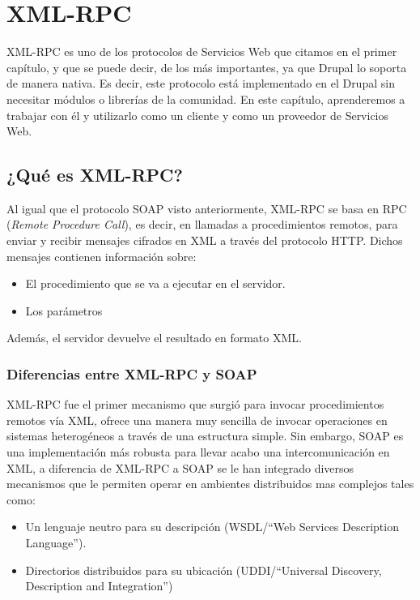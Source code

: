 \section{XML-RPC}

XML-RPC es uno de los protocolos de Servicios Web que citamos en el primer capítulo, y que se puede decir, 
de los más importantes, ya que Drupal lo soporta de manera nativa. Es decir, este protocolo está implementado 
en el Drupal sin necesitar módulos o librerías de la comunidad. En este capítulo, aprenderemos a trabajar con él 
y utilizarlo como un cliente y como un proveedor de Servicios Web.

\subsection{¿Qué es XML-RPC?}

Al igual que el protocolo SOAP visto anteriormente, XML-RPC se basa en RPC (\textit{Remote Procedure Call}), es decir, 
en llamadas a procedimientos remotos, para enviar y recibir mensajes cifrados en XML a través del protocolo HTTP.
Dichos mensajes contienen información sobre:

\begin{itemize}
  \item El procedimiento que se va a ejecutar en el servidor.
  \item Los parámetros
\end{itemize} 

Además, el servidor devuelve el resultado en formato XML.

\subsubsection{Diferencias entre XML-RPC y SOAP}

XML-RPC fue el primer mecanismo que surgió para invocar procedimientos remotos vía XML, ofrece una manera 
muy sencilla de invocar operaciones en sistemas heterogéneos a través de una estructura simple. Sin embargo, 
SOAP es una implementación más robusta para llevar acabo una intercomunicación en XML, a diferencia de XML-RPC 
a SOAP se le han integrado diversos mecanismos que le permiten operar en ambientes distribuidos mas complejos tales 
como:

\begin{itemize}
  \item Un lenguaje neutro para su descripción (WSDL/``Web Services Description Language'').
  \item Directorios distribuidos para su ubicación (UDDI/``Universal Discovery, Description and Integration'')  
\end{itemize} 

